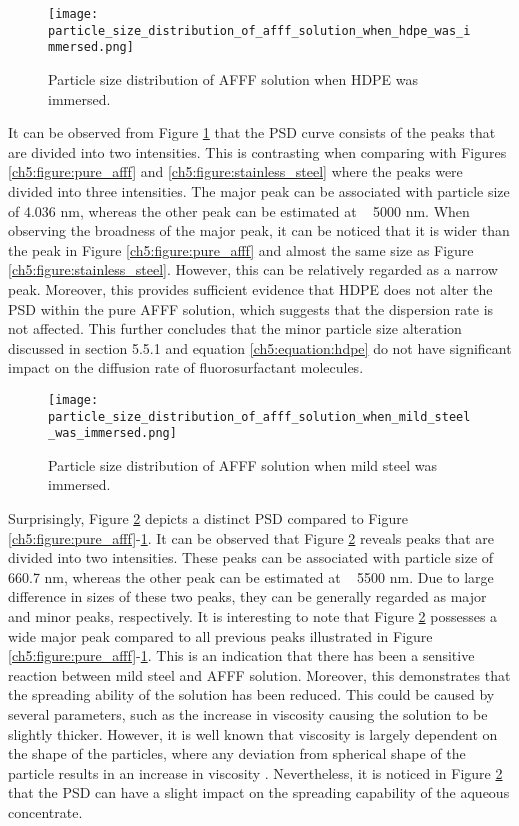 \begin{figure}[H]
    \centering
    \texttt{[image: particle\_size\_distribution\_of\_afff\_solution\_when\_hdpe\_was\_immersed.png]}
    \caption{Particle size distribution of AFFF solution when HDPE was immersed.}
    \label{ch5:figure:hdpe}
\end{figure}

It can be observed from Figure \ref{ch5:figure:hdpe} that the PSD curve consists of the peaks that are divided into two intensities. This is contrasting when comparing with Figures \ref{ch5:figure:pure_afff} and \ref{ch5:figure:stainless_steel} where the peaks were divided into three intensities. The major peak can be associated with particle size of 4.036 nm, whereas the other peak can be estimated at ~ 5000 nm. When observing the broadness of the major peak, it can be noticed that it is wider than the peak in Figure \ref{ch5:figure:pure_afff} and almost the same size as Figure \ref{ch5:figure:stainless_steel}. However, this can be relatively regarded as a narrow peak. Moreover, this provides sufficient evidence that HDPE does not alter the PSD within the pure AFFF solution, which suggests that the dispersion rate is not affected. This further concludes that the minor particle size alteration discussed in section 5.5.1 and equation \ref{ch5:equation:hdpe} do not have significant impact on the diffusion rate of fluorosurfactant molecules.    
  
\begin{figure}[H]
    \centering
    \texttt{[image: particle\_size\_distribution\_of\_afff\_solution\_when\_mild\_steel\_was\_immersed.png]}
    \caption{Particle size distribution of AFFF solution when mild steel was immersed.}
    \label{ch5:figure:mild_steel}
\end{figure}

Surprisingly, Figure \ref{ch5:figure:mild_steel} depicts a distinct PSD compared to Figure \ref{ch5:figure:pure_afff}-\ref{ch5:figure:hdpe}. It can be observed that Figure \ref{ch5:figure:mild_steel} reveals peaks that are divided into two intensities. These peaks can be associated with particle size of 660.7 nm, whereas the other peak can be estimated at ~ 5500 nm.  Due to large difference in sizes of these two peaks, they can be generally regarded as major and minor peaks, respectively.  It is interesting to note that Figure \ref{ch5:figure:mild_steel} possesses a wide major peak compared to all previous peaks illustrated in Figure \ref{ch5:figure:pure_afff}-\ref{ch5:figure:hdpe}. This is an indication that there has been a sensitive reaction between mild steel and AFFF solution. Moreover, this demonstrates that the spreading ability of the solution has been reduced. This could be caused by several parameters, such as the increase in viscosity causing the solution to be slightly thicker. However, it is well known that viscosity is largely dependent on the shape of the particles, where any deviation from spherical shape of the particle results in an increase in viscosity \cite{klein2011transmission}. Nevertheless, it is noticed in Figure \ref{ch5:figure:mild_steel} that the PSD can have a slight impact on the spreading capability of the aqueous concentrate.

